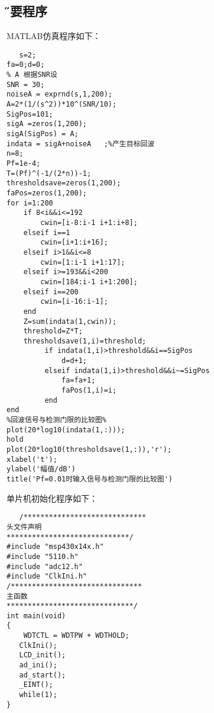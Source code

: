 \documentclass[12pt,a4paper]{article} %
\newcommand\specialsectioning{\par
  \setcounter{section}{0}%
  \setcounter{subsection}{0}%
  \renewcommand\thesection{\relax}}
\begin{document}
   \subsection*{\H 主要程序 }
   
 		\begin{compactitem} 
 			\item MATLAB仿真程序如下：
 			  \begin{lstlisting}
   s=2;
fa=0;d=0;
% A 根据SNR设 
SNR = 30;
noiseA = exprnd(s,1,200);
A=2*(1/(s^2))*10^(SNR/10);      
SigPos=101;     
sigA =zeros(1,200);
sigA(SigPos) = A;
indata = sigA+noiseA   ;%产生目标回波
n=8;
Pf=1e-4;
T=(Pf)^(-1/(2*n))-1;
thresholdsave=zeros(1,200);
faPos=zeros(1,200);
for i=1:200
    if 8<i&&i<=192
        cwin=[i-8:i-1 i+1:i+8];
    elseif i==1
        cwin=[i+1:i+16];
    elseif i>1&&i<=8
        cwin=[1:i-1 i+1:17];
    elseif i>=193&&i<200
        cwin=[184:i-1 i+1:200];
    elseif i==200
        cwin=[i-16:i-1];
    end
    Z=sum(indata(1,cwin));
    threshold=Z*T;
    thresholdsave(1,i)=threshold;
         if indata(1,i)>threshold&&i==SigPos
             d=d+1;
         elseif indata(1,i)>threshold&&i~=SigPos
             fa=fa+1;
             faPos(1,i)=i;
         end
end
%回波信号与检测门限的比较图%
plot(20*log10(indata(1,:)));
hold
plot(20*log10(thresholdsave(1,:)),'r');
xlabel('t');
ylabel('幅值/dB')
title('Pf=0.01时输入信号与检测门限的比较图')
   \end{lstlisting}

			

			
			\item    单片机初始化程序如下：
  \begin{lstlisting}
   /*****************************
头文件声明
*****************************/
#include "msp430x14x.h"
#include "5110.h"
#include "adc12.h"
#include "ClkIni.h"
/*******************************
主函数
******************************/
int main(void)
{
    WDTCTL = WDTPW + WDTHOLD;
   ClkIni();
   LCD_init();
   ad_ini();
   ad_start();
   _EINT();
   while(1);
}

   \end{lstlisting}
			
		 \end{compactitem}	

 
 
    \newpage
  \specialsectioning
  \titleformat{\section}{\centering\Huge\bfseries}{\,\thechapter\,}{1em}{}
\end{document}
